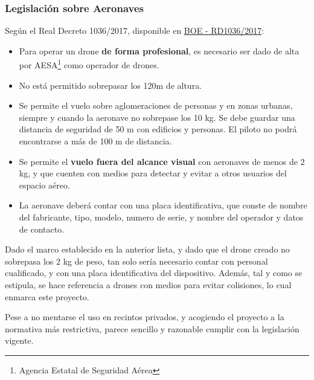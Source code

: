 \subsubsection{Legislación sobre Aeronaves}
Según el Real Decreto 1036/2017, disponible en \href{https://www.seguridadaerea.gob.es/media/4629426/rd_1036_17_rpas.pdf}{BOE - RD1036/2017}:
\begin{itemize}
\item Para operar un drone \textbf{de forma profesional}, es necesario ser dado de alta por AESA\footnote{Agencia Estatal de Seguridad Aérea} como operador de drones.
\item No está permitido sobrepasar los 120m de altura.
\item Se permite el vuelo sobre aglomeraciones de personas y en zonas urbanas, siempre y cuando la aeronave no sobrepase los 10 kg. Se debe guardar una distancia de seguridad de 50 m con edificios y personas. El piloto no podrá encontrarse a más de 100 m de distancia.
\item Se permite el \textbf{vuelo fuera del alcance visual} con aeronaves de menos de 2 kg, y que cuenten con medios para detectar y evitar a otros usuarios del espacio aéreo. 
\item La aeronave deberá contar con una placa identificativa, que conste de nombre del fabricante, tipo, modelo, numero de serie, y nombre del operador y datos de contacto.
\end{itemize}

Dado el marco establecido en la anterior lista, y dado que el drone creado no sobrepasa los 2 kg de peso, tan solo sería necesario contar con personal cualificado, y con una placa identificativa del dispositivo. Además, tal y como se estipula, se hace referencia a drones con medios para evitar colisiones, lo cual enmarca este proyecto. 

Pese a no mentarse el uso en recintos privados, y acogiendo el proyecto a la normativa más restrictiva, parece sencillo y razonable cumplir con la legislación vigente. 

